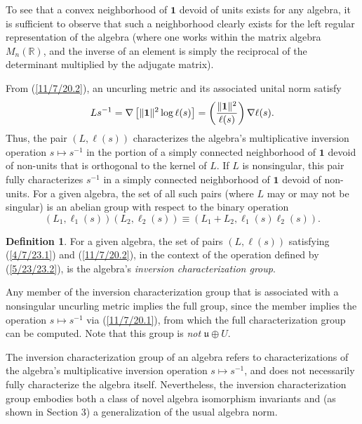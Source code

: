 \documentclass{amsart}
\numberwithin{equation}{section}
\theoremstyle{definition}
\newtheorem{definition}[theorem]{Definition}
\numberwithin{theorem}{section}
\begin{document}
To see that a convex neighborhood of $\mathbf{1}$ devoid of units exists for any algebra, it is sufficient to observe that such a neighborhood clearly exists for the left regular representation of the algebra (where one works within the matrix algebra $ M_n(\mathbb{R})$, and the inverse of an element is simply the reciprocal of the determinant multiplied by the adjugate matrix).
  
    From (\ref{11/7/20.2}), an uncurling metric and its associated unital norm satisfy  \begin{equation}\label{11/7/20.1} Ls^{-1}  = \nabla\left[\|{\bf 1}\|^2\log  \ell(s)\right] =   \left(\frac{\|{\bf 1}\|^2}{ \ell(s)}\right)\nabla \ell(s).\end{equation} 
Thus, the pair $(L, \ell(s))$ characterizes the algebra's multiplicative inversion operation $s\mapsto s^{-1}$ in the portion of a simply connected neighborhood of $\mathbf{1}$ devoid of non-units that is orthogonal to the kernel of $L$.  If $L$ is nonsingular, this pair fully characterizes $s^{-1}$ in a simply connected neighborhood of $\mathbf{1}$ devoid of non-units.  For a given algebra, the set of all such pairs (where $L$ may or may not be singular) is an abelian group with respect to the binary operation 
\begin{equation}\label{5/23/23.2} (L_1, \ell_1(s))(L_2, \ell_2(s)) \equiv 
\left(L_1+L_2, \ell_1(s)  \ell_2(s)\right).\end{equation} 
\begin{definition} For a given algebra, the set of pairs $(L, \ell(s))$ satisfying (\ref{4/7/23.1}) and (\ref{11/7/20.2}), in the context of the operation defined by (\ref{5/23/23.2}), is the algebra's {\it inversion characterization group}. \end{definition}

Any member of the inversion characterization group that is associated with a nonsingular uncurling metric implies the full group, since the member implies the operation $s\mapsto s^{-1}$ via (\ref{11/7/20.1}), from which the full characterization group can be computed.  Note that this group is {\it not} $\mathfrak{u}\oplus U$.

The inversion characterization group of an algebra refers to characterizations of the algebra's multiplicative inversion operation $s\mapsto s^{-1}$, and does not necessarily fully characterize the algebra itself.  
Nevertheless,  the inversion characterization group embodies both a class of  novel algebra isomorphism invariants and (as shown in Section 3) a generalization of the usual algebra norm.  
\end{document}
